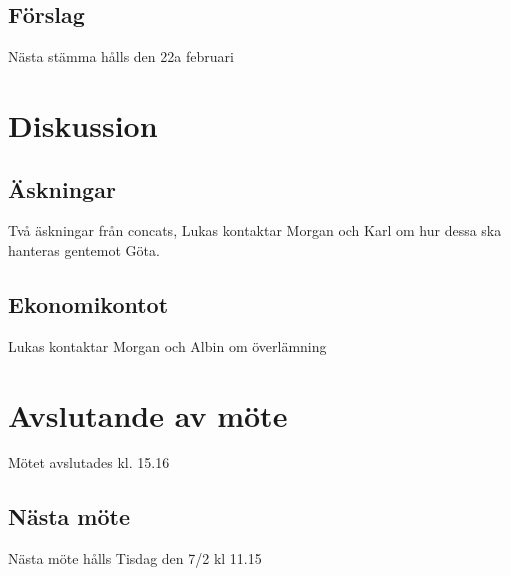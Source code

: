 \documentclass[protokoll]{dvd}
\begin{document}
\subsection{Förslag}
\begin{attsatser}
  \item Nästa stämma hålls den 22a februari
\end{attsatser}

\section{Diskussion}

\subsection{Äskningar}
Två äskningar från concats, Lukas kontaktar Morgan och Karl om hur dessa ska hanteras gentemot Göta.

\subsection{Ekonomikontot}
Lukas kontaktar Morgan och Albin om överlämning

\section{Avslutande av möte}
Mötet avslutades kl. 15.16


\subsection{Nästa möte}
Nästa möte hålls Tisdag den 7/2 kl 11.15


\styrelsesignaturer
\end{document}
